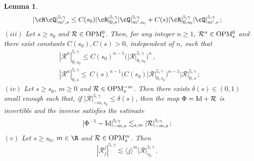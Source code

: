 \documentclass[a4paper,reqno,10pt]{article}
\newtheorem{lem}{Lemma}[section]
\newcommand{\OpM}{{\rm O}{\rm P}{\rm M}}
\begin{document}
\begin{lem}
\begin{equation}
    |\cR \cQ|_{m', s}^{5,\gamma} \leq C(s_{0})|\cR|_{0, s}^{5,\gamma} |\cQ|_{m',s_{0}}^{5,\gamma} + C(s) |\cR|_{0,s_{0}}^{5,\gamma} |\cQ|_{m', s}^{5,\gamma} \,;
\end{equation}
\noindent $(iii)$ Let $s \geq s_{0}$ and ${\mathcal R} \in \OpM_{s}^0$. 
Then, for any integer $n \geq 1$, ${\mathcal R}^n \in \OpM_{s}^0$ and there exist constants $C(s_0),C(s) > 0$, independent of $n$, such that 
\begin{equation*}
	\begin{aligned}
		& |{\mathcal R}^n|_{0, s_0}^{5,\gamma} \leq C(s_0)^{n - 1} \big(|{\mathcal R}|_{0, s_0}^{5,\gamma}\big)^{n} \,, \\
		& |{\mathcal R}^n|_{0, s}^{5,\gamma} \leq \,C(s)^{n - 1} \big(C(s_0)|{\mathcal R}|_{0, s_0}^{5,\gamma}\big)^{n - 1} |{\mathcal R}|_{0, s}^{5,\gamma}\,;
	\end{aligned}
\end{equation*}
\noindent $(iv)$ Let $s \geq s_{0}$, $m \geq 0$ and ${\mathcal R} \in \OpM_{s}^{-m}$. 
Then there exists $\delta(s) \in (0, 1)$ small enough such that, 
if $|{\mathcal R}|_{- m, s_0}^{5,\gamma} \leq \delta(s)$, 
then the map $\Phi = {\rm Id} + {\mathcal R}$ is invertible 
and the inverse satisfies the estimate 
\[
|\Phi^{- 1} - {\rm Id}|_{- m, s}^{5,\gamma} \lesssim_{s, m} |{\mathcal R}|_{- m, s}^{5,\gamma} \,;
\]
\noindent
$(v)$ Let $s \geq s_0$, $m \in \R$ and ${\mathcal R} \in \OpM_{s}^m$. 
Then 
\[
| \mathcal R_j^j |^{5,\gamma} \lesssim \langle j \rangle^m|{\mathcal R}|_{s_0}^{5,\gamma}\,.
\] 
\end{lem}
\end{document}
